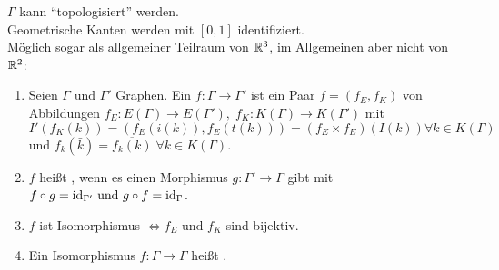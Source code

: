 \documentclass[a4paper, 10pt]{report}
\begin{document}
\begin{nnBem}
  $\Gamma$ kann ``topologisiert'' werden.\\
  Geometrische Kanten werden mit $[0,1]$ identifiziert.\\
  Möglich sogar	als allgemeiner Teilraum von $\mathbb{R}^3$, im Allgemeinen aber nicht
  von $\mathbb{R}^2$:
\end{nnBem}

\begin{DefBem}
\begin{enumerate}
  \item Seien $\Gamma \textrm{ und } \Gamma'$ Graphen.
  Ein  $f: \Gamma \to \Gamma'$ ist ein Paar $f = (f_E, f_K)$ von
  Abbildungen $f_E: E(\Gamma) \to E(\Gamma'), \; f_K: K(\Gamma) \to K(\Gamma')$
  mit $I'(f_K(k)) = (f_E(i(k)), f_E(t(k)))  = (f_E \times f_E)(I(k)) \forall k \in K(\Gamma)$ und $f_k(\bar{k}) = \overline{f_k(k)} \; \forall k \in
  K(\Gamma)$.
  \item $f$ heißt , wenn es einen Morphismus $g: \Gamma' \to \Gamma$
  gibt mit $f \circ g = \textrm{id}_{\Gamma'} \textrm{ und } g \circ f = \textrm{id}_{\Gamma}$.
  \item $f$ ist Isomorphismus $\Leftrightarrow f_E \textrm{ und } f_K$ sind
  bijektiv.
  \item Ein Isomorphismus $f: \Gamma \to \Gamma$ heißt .
\end{enumerate}
\end{DefBem}

\end{document}
